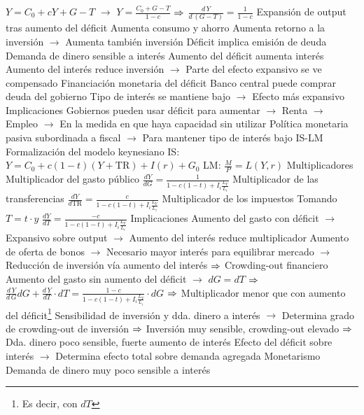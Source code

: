 \documentclass{nuevotema}
\begin{document}
\begin{esquemal}
				\4[] $Y = C_0 + c Y + G - T$
				\4[] $\to$ $Y = \frac{C_0 + G - T}{1-c}$
				\4[] $\Rightarrow$ $\frac{d \, Y}{d \, (G - T)} = \frac{1}{1-c}$
				\4 Expansión de output tras aumento del déficit
				\4[] Aumenta consumo y ahorro
				\4[] Aumenta retorno a la inversión
				\4[] $\to$ Aumenta también inversión
				\4 Déficit implica emisión de deuda
				\4 Demanda de dinero sensible a interés
				\4[] Aumento del déficit aumenta interés
				\4[] Aumento del interés reduce inversión
				\4[] $\to$ Parte del efecto expansivo se ve compensado
				\4 Financiación monetaria del déficit
				\4[] Banco central puede comprar deuda del gobierno
				\4[] Tipo de interés se mantiene bajo
				\4[] $\to$ Efecto más expansivo
				\4 Implicaciones
				\4[] Gobiernos pueden usar déficit para aumentar
				\4[] $\to$ Renta
				\4[] $\to$ Empleo
				\4[] $\to$ En la medida en que haya capacidad sin utilizar
				\4[] Política monetaria pasiva subordinada a fiscal
				\4[] $\to$ Para mantener tipo de interés bajo
			\3 IS-LM
				\4 Formalización del modelo keynesiano
				\4[] IS: $Y = C_0 + c(1-t)(Y+\text{TR}) + I(r) + G_0$
				\4[] LM: $\frac{M}{P} = L(Y,r)$
				\4 Multiplicadores
				\4[] Multiplicador del gasto público
				\4[] $\frac{d Y}{d G} = \frac{1}{1-c(1-t) + I_i \frac{L_Y}{L_i}}$
				\4[] Multiplicador de las transferencias
				\4[] $\frac{d Y}{d \text{TR}} = \frac{c}{1-c(1-t) + I_i \frac{L_Y}{L_i}}$
				\4[] Multiplicador de los impuestos
				\4[] Tomando $T=t\cdot y$
				\4[] $\frac{d Y}{d T} = \frac{-c}{1-c(1-t) + I_i \frac{L_Y}{L_i}}$
				\4 Implicaciones
				\4[] Aumento del gasto con déficit
				\4[] $\to$ Expansivo sobre output
				\4[] $\to$ Aumento del interés reduce multiplicador
				\4[] Aumento de oferta de bonos
				\4[] $\to$ Necesario mayor interés para equilibrar mercado
				\4[] $\to$ Reducción de inversión vía aumento del interés
				\4[] $\Rightarrow$ Crowding-out financiero
				\4[] Aumento del gasto sin aumento del déficit
				\4[] $\to$ $d G = d T$
				\4[] $\Rightarrow$ $\frac{d \, Y}{d \, G} d G + \frac{d \, Y}{d T} \cdot dT = \frac{1-c}{1-c(1-t) + I_i \frac{L_Y}{L_i}} \cdot d G$
				\4[] $\Rightarrow$ Multiplicador menor que con aumento del déficit\footnote{Es decir, con $d T$}
				\4[] Sensibilidad de inversión y dda. dinero a interés
				\4[] $\to$ Determina grado de crowding-out de inversión
				\4[] $\Rightarrow$ Inversión muy sensible, crowding-out elevado
				\4[] $\Rightarrow$ Dda. dinero poco sensible, fuerte aumento de interés
				\4[] Efecto del déficit sobre interés
				\4[] $\to$ Determina efecto total sobre demanda agregada
			\3 Monetarismo
				\4 Demanda de dinero muy poco sensible a interés

\end{esquemal}
\end{document}
